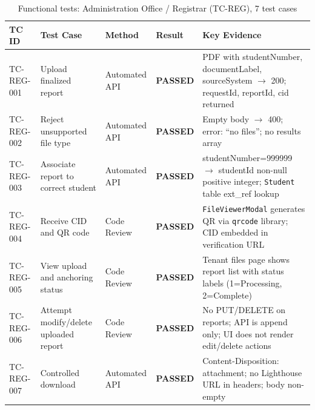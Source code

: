 \begin{table}[H]
  \centering
  \smalltable
  \footnotesize
  {%
  \setlength{\tabcolsep}{4pt}
  \renewcommand{\arraystretch}{1.3}
  \begin{tabular}{|>{\raggedright\arraybackslash}p{}|
                  >{\raggedright\arraybackslash}p{}|
                  >{\raggedright\arraybackslash}p{}|
                  >{\centering\arraybackslash}p{}|
                  >{\raggedright\arraybackslash}p{}|}
    \hline
    \textbf{TC ID} & \textbf{Test Case} & \textbf{Method} & \textbf{Result} & \textbf{Key Evidence} \\
    \hline\hline
    TC-REG-001 & Upload finalized report & Automated API & \textbf{PASSED} & PDF with studentNumber, documentLabel, sourceSystem $\rightarrow$ 200; requestId, reportId, cid returned \\
    \hline
    TC-REG-002 & Reject unsupported file type & Automated API & \textbf{PASSED} & Empty body $\rightarrow$ 400; error: ``no files''; no results array \\
    \hline
    TC-REG-003 & Associate report to correct student & Automated API & \textbf{PASSED} & studentNumber=999999 $\rightarrow$ studentId non-null positive integer; \texttt{Student} table ext\_ref lookup \\
    \hline
    TC-REG-004 & Receive CID and QR code & Code Review & \textbf{PASSED} & \texttt{FileViewerModal} generates QR via \texttt{qrcode} library; CID embedded in verification URL \\
    \hline
    TC-REG-005 & View upload and anchoring status & Code Review & \textbf{PASSED} & Tenant files page shows report list with status labels (1=Processing, 2=Complete) \\
    \hline
    TC-REG-006 & Attempt modify/delete uploaded report & Code Review & \textbf{PASSED} & No PUT/DELETE on reports; API is append only; UI does not render edit/delete actions \\
    \hline
    TC-REG-007 & Controlled download & Automated API & \textbf{PASSED} & Content-Disposition: attachment; no Lighthouse URL in headers; body non-empty \\
    \hline
  \end{tabular}
  }%
  \captionsetup{type=table}
  \caption{Functional tests: Administration Office / Registrar (TC-REG), 7 test cases}
  \label{tab:func-reg}
\end{table}

